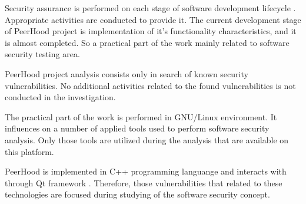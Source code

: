 %
Security assurance is performed on each stage of software development lifecycle . 
%
Appropriate activities are conducted to provide it. 
%
The current development stage of PeerHood project is implementation of it's functionality characteristics, and it is almost completed. 
%
So a practical part of the work mainly related to software security testing area. 

%
PeerHood project analysis consists only in search of known security vulnerabilities. 
%
No additional activities related to the found vulnerabilities is not conducted in the investigation. 

%
The practical part of the work is performed in GNU/Linux  environment. 
%
It influences on a number of applied tools used to perform software security analysis. 
%
Only those tools are utilized during the analysis that are available on this platform. 

%
PeerHood is implemented in C++ programming languange  and interacts with  through Qt framework . 
%
Therefore, those vulnerabilities that related to these technologies are focused during studying of the software security concept. 